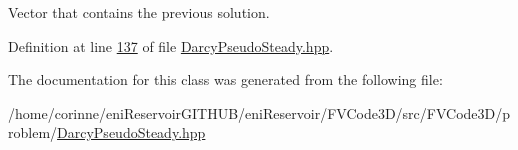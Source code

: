 Vector that contains the previous solution. 



Definition at line \hyperlink{DarcyPseudoSteady_8hpp_source_l00137}{137} of file \hyperlink{DarcyPseudoSteady_8hpp_source}{Darcy\+Pseudo\+Steady.\+hpp}.



The documentation for this class was generated from the following file\+:\begin{DoxyCompactItemize}
\item 
/home/corinne/eni\+Reservoir\+G\+I\+T\+H\+U\+B/eni\+Reservoir/\+F\+V\+Code3\+D/src/\+F\+V\+Code3\+D/problem/\hyperlink{DarcyPseudoSteady_8hpp}{Darcy\+Pseudo\+Steady.\+hpp}\end{DoxyCompactItemize}
